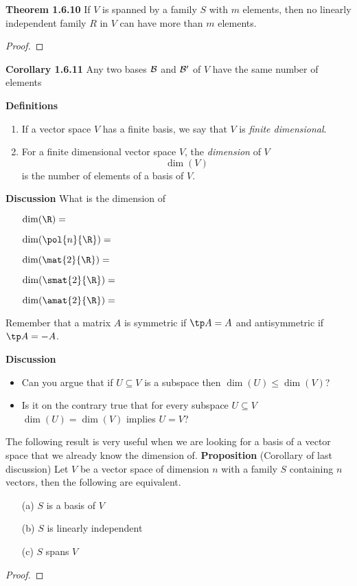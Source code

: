\documentclass[letterpaper, 10pt]{article}
\begin{document}
\lb
\textbf{Theorem 1.6.10}
\lb
If $V$ is spanned by a family $S$ with $m$ elements, then no linearly
independent family $R$ in $V$ can have more than $m$ elements.
\begin{proof}
\end{proof}



\vspace{400pt}
\lb
\textbf{Corollary 1.6.11}
\lb
Any two bases $\cal B$ and $\cal B'$ of $V$ have the same number of elements



\newpage
\lb
\textbf{Definitions}
\begin{enumerate}
    \item If a vector space $V$ has a finite basis, we say that $V$ is
        \emph{finite dimensional}.
    \item For a finite dimensional vector space $V$, the \emph{dimension}
        of $V$
        \[ \dim(V) \]
        is the number of elements of a basis of $V$.
\end{enumerate}


\lb
\textbf{Discussion} 
\lb
What is the dimension of 
\begin{enumerate}
    \item[] $\dim( \R ) = $
    \item[] $\dim( \pol{n}{\R} ) = $
    \item[] $\dim( \mat{2}{\R} ) = $
    \item[] $\dim( \smat{2}{\R} ) = $
    \item[] $\dim( \amat{2}{\R} ) = $
\end{enumerate}
\lb
Remember that a matrix $A$ is symmetric if $\tp A = A$ and antisymmetric if $\tp A = -A$.



\vspace{100pt}
\lb
\textbf{Discussion}
\begin{itemize}
    \item
    Can you argue that if $U \subseteq V$ is a subspace then $\dim (U) \leq \dim(V)$?
    \item
    Is it on the contrary true that for every subspace $U \subseteq V$
    $\dim(U) = \dim(V)$ implies  $U = V$?
\end{itemize}




\newpage
\lb
The following result is very useful when we are looking for a basis
of a vector space that we already know the dimension of.
\lb
\textbf{Proposition} (Corollary of last discussion)
\lb
Let $V$ be a vector space of dimension $n$ with a family $S$ containing $n$ vectors,
then the following are equivalent.
\begin{enumerate}
    \item[(a)]
        $S$ is a basis of $V$
    \item[(b)]
        $S$ is linearly independent
    \item[(c)]
        $S$ spans $V$
\end{enumerate}
\begin{proof}
\end{proof}
\end{document}
